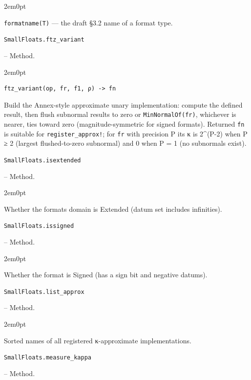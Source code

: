 \begin{adjustwidth}{2em}{0pt}

\texttt{formatname(T)} — the draft §3.2 name of a format type.



\end{adjustwidth}
\hypertarget{17132358657286871632}{\texttt{SmallFloats.ftz\_variant}}  -- {Method.}

\begin{adjustwidth}{2em}{0pt}


\begin{verbatim}
ftz_variant(op, fr, f1, ρ) -> fn
\end{verbatim}

Build the Annex-style approximate unary implementation: compute the defined result, then flush subnormal results to zero or \texttt{MinNormalOf(fr)}, whichever is nearer, ties toward zero (magnitude-symmetric for signed formats). Returned \texttt{fn} is suitable for \texttt{register\_approx!}; for \texttt{fr} with precision P its κ is 2{\textasciicircum}(P-2) when P ≥ 2 (largest flushed-to-zero subnormal) and 0 when P = 1 (no subnormals exist).



\end{adjustwidth}
\hypertarget{4250219520413861193}{\texttt{SmallFloats.isextended}}  -- {Method.}

\begin{adjustwidth}{2em}{0pt}

Whether the format{\textquotesingle}s domain is Extended (datum set includes infinities).



\end{adjustwidth}
\hypertarget{11031203868920563628}{\texttt{SmallFloats.issigned}}  -- {Method.}

\begin{adjustwidth}{2em}{0pt}

Whether the format is Signed (has a sign bit and negative datums).



\end{adjustwidth}
\hypertarget{2984505828320663690}{\texttt{SmallFloats.list\_approx}}  -- {Method.}

\begin{adjustwidth}{2em}{0pt}

Sorted names of all registered κ-approximate implementations.



\end{adjustwidth}
\hypertarget{14020185040969508771}{\texttt{SmallFloats.measure\_kappa}}  -- {Method.}

